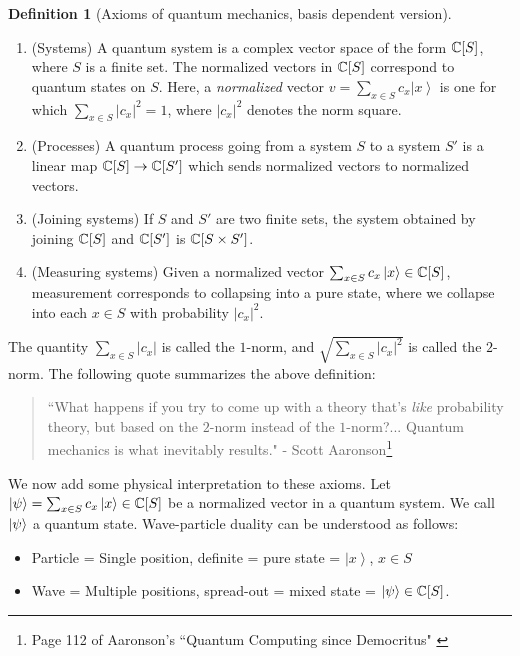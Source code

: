 \documentclass{article}
\theoremstyle{definition}
\newtheorem*{definition}{Definition}
\numberwithin{figure}{section}
\begin{document}
\begin{definition}[Axioms of quantum mechanics, basis dependent version] $\,$

\begin{enumerate}
\item (Systems) A quantum system is a complex vector space of the form $\mathbb{C}[S]$, where $S$ is a finite set. The normalized vectors in $\mathbb{C}[S]$ correspond to quantum states on $S$. Here, a \textit{normalized} vector $v=\sum_{x\in S}c_x\left|x\right>$ is one for which $\sum_{x\in S}|c_x|^2=1$, where $|c_x|^2$ denotes the norm square.
\item (Processes) A quantum process going from a system $S$ to a system $S'$ is a linear map $\mathbb{C}[S]\to \mathbb{C}[S']$ which sends normalized vectors to normalized vectors.
\item (Joining systems) If $S$ and $S'$ are two finite sets, the system obtained by joining $\mathbb{C}[S]$ and $\mathbb{C}[S']$ is $\mathbb{C}[S\times S']$.
\item (Measuring systems) Given a normalized vector $\sum_{x\in S}c_x \left |x\right>\in \mathbb{C}[S]$, measurement corresponds to collapsing into a pure state, where we collapse into each $x\in S$ with probability $|c_x|^2$.
\end{enumerate}

\raggedleft\qedsymbol{}
\end{definition}


The quantity $\sum_{x\in S}|c_x|$ is called the $1$-norm, and $\sqrt{\sum_{x\in S}|c_x|^2}$ is called the $2$-norm. The following quote summarizes the above definition:

\begin{quote}
``What happens if you try to come up with a theory that's \textit{like} probability theory, but based on the $2$-norm instead of the $1$-norm?... Quantum mechanics is what inevitably results." - Scott Aaronson\footnote{Page 112 of Aaronson's ``Quantum Computing since Democritus" \cite{aaronson2013quantum}}
\end{quote}

We now add some physical interpretation to these axioms. Let $\left|\psi\right>=\sum_{x\in S}c_x\left|x\right>\in \mathbb{C}[S]$ be a normalized vector in a quantum system. We call $\left|\psi\right>$ a quantum state. Wave-particle duality can be understood as follows:

\begin{itemize}
\item Particle = Single position, definite = pure state = $\left|x\right>$, $x\in S$
\item Wave = Multiple positions, spread-out = mixed state = $\left|\psi\right>\in \mathbb{C}[S]$.
\end{itemize}
\end{document}

